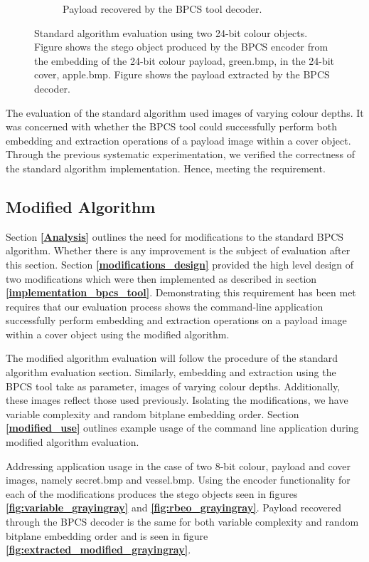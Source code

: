 \documentclass{l4proj}
\begin{document}
\begin{figure}[]
\begin{subfigure}[b]{0.4\textwidth}
        \caption{Payload recovered by the BPCS tool decoder.}
        \label{fig:extracted_green}
    \end{subfigure}
    \caption{Standard algorithm evaluation using two 24-bit colour objects. Figure  shows the stego object produced by the BPCS encoder from the embedding of the 24-bit colour payload, green.bmp, in the 24-bit cover, apple.bmp. Figure  shows the payload extracted by the BPCS decoder.}
\end{figure}


The evaluation of the standard algorithm used images of varying colour depths. It was concerned with whether the BPCS tool could successfully perform both embedding and extraction operations of a payload image within a cover object. Through the previous systematic experimentation, we verified the correctness of the standard algorithm implementation. Hence, meeting the requirement.


\subsection{Modified Algorithm}\label{evaluation_modified_algorithm}

Section \textbf{\ref{Analysis}} outlines the need for modifications to the standard BPCS algorithm. Whether there is any improvement is the subject of evaluation after this section. Section \textbf{\ref{modifications_design}} provided the high level design of two modifications which were then implemented as described in section \textbf{\ref{implementation_bpcs_tool}}. Demonstrating this requirement has been met requires that our evaluation process shows the command-line application successfully perform embedding and extraction operations on a payload image within a cover object using the modified algorithm. 

The modified algorithm evaluation will follow the procedure of the standard algorithm evaluation section. Similarly, embedding and extraction using the BPCS tool take as parameter, images of varying colour depths. Additionally, these images reflect those used previously. Isolating the modifications, we have variable complexity and random bitplane embedding order.  Section \textbf{\ref{modified_use}} outlines example usage of the command line application during modified algorithm evaluation.

Addressing application usage in the case of two 8-bit colour, payload and cover images, namely secret.bmp and vessel.bmp. Using the encoder functionality for each of the modifications produces the stego objects seen in figures \textbf{\ref{fig:variable_grayingray}} and \textbf{\ref{fig:rbeo_grayingray}}. Payload recovered through the BPCS decoder is the same for both variable complexity and random bitplane embedding order and is seen in figure \textbf{\ref{fig:extracted_modified_grayingray}}. 
\end{document}
